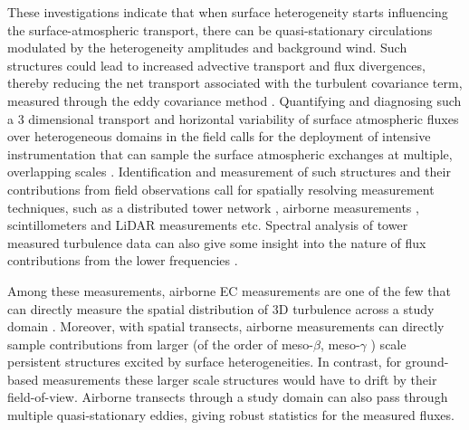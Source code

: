 \documentclass[draft]{agujournal2019}
\begin{document}
These investigations indicate that when surface heterogeneity starts influencing the surface-atmospheric transport, there can be quasi-stationary circulations modulated by the heterogeneity amplitudes and background wind. Such structures could lead to increased advective transport and flux divergences, thereby reducing the net transport associated with the turbulent covariance term, measured through the eddy covariance method \cite{mahrt_computing_2010, mauder_surface-energy-balance_2020}. Quantifying and diagnosing such a  3 dimensional transport and horizontal variability of surface atmospheric fluxes over heterogeneous domains in the field calls for the deployment of intensive instrumentation that can sample the surface atmospheric exchanges at multiple, overlapping scales \cite{wulfmeyer_new_2018}. Identification and measurement of such structures and their contributions from field observations call for spatially resolving measurement techniques, such as a distributed tower network \cite{oncley_energy_2007, mauder_measurement_2008, engelmann_exploring_2016, morrison_impact_2021}, airborne measurements \cite{mahrt_flux_1998, strunin_applying_2004, bange_airborne_2002, bange_turbulent_2006, mauder_energy_2007}, scintillometers \cite{foken_energy_2010, xu_area-averaged_2017, meijninger_scintillometer-based_2006} and LiDAR measurements \cite{drobinski_evidence_1998,higgins_measured_2013, eder_mesoscale_2015} etc. Spectral analysis of tower measured turbulence data can also give some insight into the nature of flux contributions from the lower frequencies \cite{zhang_turbulence_2010, zhang_multi-scale_2014, zhou_effects_2019, gao_enlarged_2020}.

Among these measurements, airborne EC measurements are one of the few that can  directly measure the spatial distribution of 3D turbulence across a study domain
\cite{mahrt_flux_1998, mahrt_computing_2010}. Moreover, with spatial transects, airborne measurements can directly sample contributions from larger (of the order of meso-$\beta$, meso-$\gamma$ ) scale persistent structures excited by surface heterogeneities. In contrast, for ground-based measurements these larger scale structures would have to drift by their field-of-view. Airborne transects through a study domain can also pass through multiple quasi-stationary eddies, giving robust statistics for the measured fluxes. 
\end{document}
